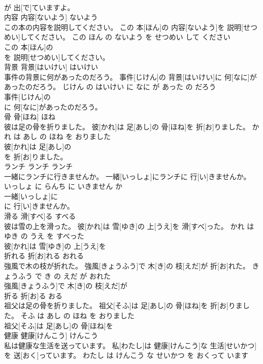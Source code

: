 \documentclass[8pt]{extreport}
\begin{document}
\begin{CJK}{UTF8}{min}
\\	が 出[で]ていますよ。			
\\	内容	内容[ないよう]	ないよう	
\\	この本の内容を説明してください。	この 本[ほん]の 内容[ないよう]を 説明[せつめい]してください。	この ほん の ないよう を せつめい して ください	
\\	この 本[ほん]の
\\	を 説明[せつめい]してください。			
\\	背景	背景[はいけい]	はいけい	
\\	事件の背景に何があったのだろう。	事件[じけん]の 背景[はいけい]に 何[なに]があったのだろう。	じけん の はいけい に なに が あった の だろう	
\\	事件[じけん]の
\\	に 何[なに]があったのだろう。			
\\	骨	骨[ほね]	ほね	
\\	彼は足の骨を折りました。	彼[かれ]は 足[あし]の 骨[ほね]を 折[お]りました。	かれ は あし の ほね を おりました	
\\	彼[かれ]は 足[あし]の
\\	を 折[お]りました。			
\\	ランチ	ランチ	ランチ	
\\	一緒にランチに行きませんか。	一緒[いっしょ]にランチに 行[い]きませんか。	いっしょ に らんち に いきません か	
\\	一緒[いっしょ]に
\\	に 行[い]きませんか。			
\\	滑る	滑[すべ]る	すべる	
\\	彼は雪の上を滑った。	彼[かれ]は 雪[ゆき]の 上[うえ]を 滑[すべ]った。	かれ は ゆき の うえ を すべった	
\\	彼[かれ]は 雪[ゆき]の 上[うえ]を
\\	折れる	折[お]れる	おれる	
\\	強風で木の枝が折れた。	強風[きょうふう]で 木[き]の 枝[えだ]が 折[お]れた。	きょうふう で き の えだ が おれた	
\\	強風[きょうふう]で 木[き]の 枝[えだ]が
\\	折る	折[お]る	おる	
\\	祖父は足の骨を折りました。	祖父[そふ]は 足[あし]の 骨[ほね]を 折[お]りました。	そふ は あし の ほね を おりました	
\\	祖父[そふ]は 足[あし]の 骨[ほね]を
\\	健康	健康[けんこう]	けんこう	
\\	私は健康な生活を送っています。	私[わたし]は 健康[けんこう]な 生活[せいかつ]を 送[おく]っています。	わたし は けんこう な せいかつ を おくって います	

\end{CJK}
\end{document}
